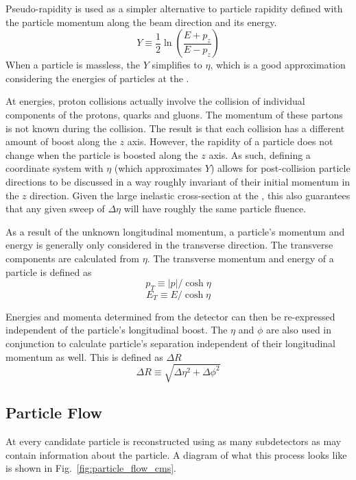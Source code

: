 Pseudo-rapidity is used as a simpler alternative to particle rapidity defined with the particle momentum along the beam direction and its energy.
\begin{equation}
    Y \equiv \frac{1}{2} \ln{\left( \frac{E+p_z}{E-p_z} \right)}
    \label{eq:rapidity}
\end{equation}
When a particle is massless, the \ensuremath{Y} simplifies to \ensuremath{\eta}, which is a good approximation considering the energies of particles at the \LHC.

At \LHC energies, proton collisions actually involve the collision of individual components of the protons, quarks and gluons.  The momentum of these partons is not known during the collision.  The result is that each collision has a different amount of boost along the \ensuremath{z} axis.  
However, the rapidity of a particle does not change when the particle is boosted along the \ensuremath{z} axis.  As such, defining a coordinate system with \ensuremath{\eta} (which approximates \ensuremath{Y}) allows for post-collision particle directions to be discussed in a way roughly invariant of their initial momentum in the \ensuremath{z} direction.  Given the large inelastic cross-section at the \LHC, this also guarantees that any given sweep of \ensuremath{\Delta \eta} will have roughly the same particle fluence.

As a result of the unknown longitudinal momentum, a particle's momentum and energy is generally only considered in the transverse direction.  The transverse components are calculated from \ensuremath{\eta}.  The transverse momentum and energy of a particle is defined as
\begin{equation}
    p_T \equiv |p| / \cosh{\eta} 
    \label{eq:pT}
\end{equation}{}
\begin{equation}
    E_T \equiv E / \cosh{\eta} 
    \label{eq:Et}
\end{equation}{}

Energies and momenta determined from the detector can then be re-expressed independent of the particle's longitudinal boost. The \ensuremath{\eta} and \ensuremath{\phi} are also used in conjunction to calculate particle's separation independent of their longitudinal momentum as well.  This is defined as \ensuremath{\Delta R}
\begin{equation}
    \Delta R \equiv \sqrt{\Delta\eta^2 + \Delta\phi^2} 
    \label{eq:dR}
\end{equation}
\subsection{Particle Flow}
At \CMS every candidate particle is reconstructed using as many subdetectors as may contain information about the particle. A diagram of what this process looks like is shown in Fig.~\ref{fig:particle_flow_cms}.


